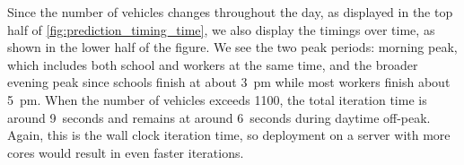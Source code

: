 Since the number of vehicles changes throughout the day, as displayed in the top half of \cref{fig:prediction_timing_time}, we also display the timings over time, as shown in the lower half of the figure. We see the two peak periods: morning peak, which includes both school and workers at the same time, and the broader evening peak since schools finish at about 3~pm while most workers finish about 5~pm. When the number of vehicles exceeds 1100, the total iteration time is around 9~seconds and remains at around 6~seconds during daytime off-peak. Again, this is the wall clock iteration time, so deployment on a server with more cores would result in even faster iterations.
